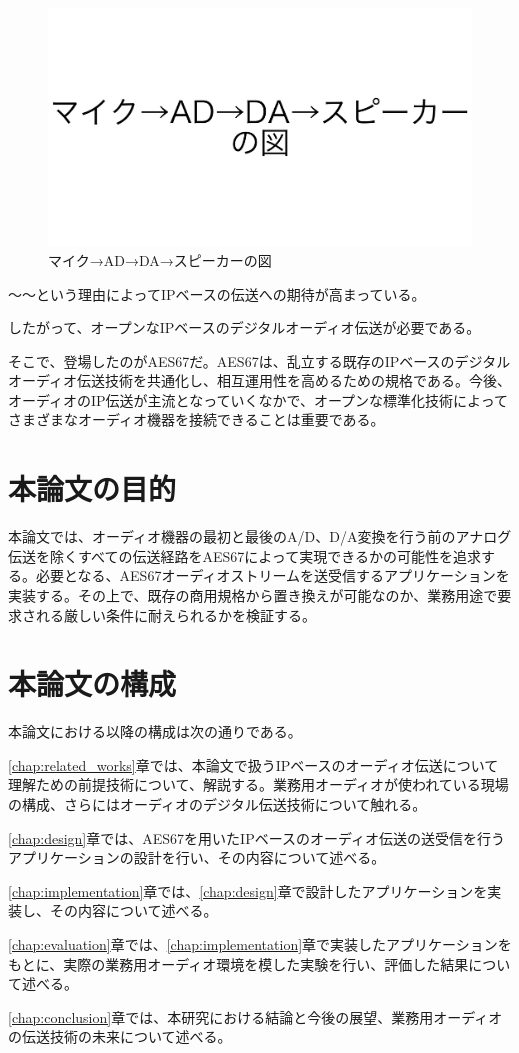 \begin{figure}[htbp]
  \centering
  \label{fig:first_and_last_need_ad_da}
  \includegraphics[width=0.8\linewidth]{img/first_and_last_need_ad_da.pdf}
  \caption{マイク→AD→DA→スピーカーの図}
\end{figure}

〜〜という理由によってIPベースの伝送への期待が高まっている。

したがって、オープンなIPベースのデジタルオーディオ伝送が必要である。

そこで、登場したのがAES67だ。AES67は、乱立する既存のIPベースのデジタルオーディオ伝送技術を共通化し、相互運用性を高めるための規格である。今後、オーディオのIP伝送が主流となっていくなかで、オープンな標準化技術によってさまざまなオーディオ機器を接続できることは重要である。

\section{本論文の目的}

本論文では、オーディオ機器の最初と最後のA/D、D/A変換を行う前のアナログ伝送を除くすべての伝送経路をAES67によって実現できるかの可能性を追求する。必要となる、AES67オーディオストリームを送受信するアプリケーションを実装する。その上で、既存の商用規格から置き換えが可能なのか、業務用途で要求される厳しい条件に耐えられるかを検証する。

\section{本論文の構成}

本論文における以降の構成は次の通りである。

\ref{chap:related_works}章では、本論文で扱うIPベースのオーディオ伝送について理解ための前提技術について、解説する。業務用オーディオが使われている現場の構成、さらにはオーディオのデジタル伝送技術について触れる。

\ref{chap:design}章では、AES67を用いたIPベースのオーディオ伝送の送受信を行うアプリケーションの設計を行い、その内容について述べる。

\ref{chap:implementation}章では、\ref{chap:design}章で設計したアプリケーションを実装し、その内容について述べる。

\ref{chap:evaluation}章では、\ref{chap:implementation}章で実装したアプリケーションをもとに、実際の業務用オーディオ環境を模した実験を行い、評価した結果について述べる。

\ref{chap:conclusion}章では、本研究における結論と今後の展望、業務用オーディオの伝送技術の未来について述べる。

